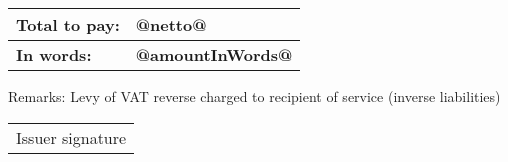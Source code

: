 \documentclass[a4paper,12pt,oneside]{mwart}
\makeatletter
\newcommand{\issuer}{@issuer@}
\newcommand{\netto}{@netto@}
\newcommand{\amountInWords}{@amountInWords@}
\newcommand{\sig}{\@signature@{\Large{\color{Blue!60!black}{\issuer}}}}
\makeatother
\begin{document}
\bigskip
\begin{flushleft}
	\begin{small}
		\begin{tabular}{ l l }
			\textbf{Total to pay:}&\textbf{\netto} \\
		\hline
			\textbf{In words:}&\textbf{\amountInWords}
		\end{tabular}
	\end{small}
\end{flushleft}
\bigskip

\begin{flushleft}
	\begin{small}
		Remarks: Levy of VAT reverse charged to recipient of service (inverse liabilities)
	\end{small}
\end{flushleft}

\bigskip
\begin{tabular}{ c }
\sig \\
\hline
Issuer signature
\end{tabular}
\end{document}
